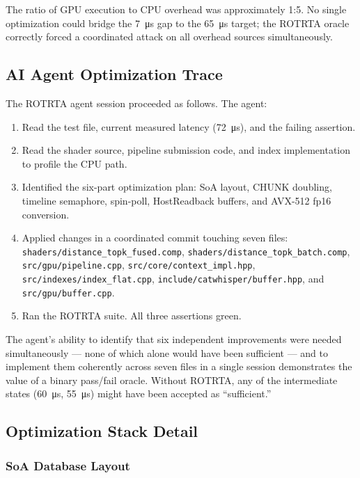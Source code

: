 \documentclass[conference]{IEEEtran}
\begin{document}
The ratio of GPU execution to CPU overhead was approximately 1:5.  No
single optimization could bridge the \SI{7}{\micro\second} gap to the
\SI{65}{\micro\second} target; the ROTRTA oracle correctly forced a
coordinated attack on all overhead sources simultaneously.

\subsection{AI Agent Optimization Trace}

The ROTRTA agent session proceeded as follows.  The agent:

\begin{enumerate}
  \item Read the test file, current measured latency (\SI{72}{\micro\second}),
        and the failing assertion.
  \item Read the shader source, pipeline submission code, and index
        implementation to profile the CPU path.
  \item Identified the six-part optimization plan: SoA layout, CHUNK
        doubling, timeline semaphore, spin-poll, HostReadback buffers, and
        AVX-512 fp16 conversion.
  \item Applied changes in a coordinated commit touching seven files:
        \texttt{shaders/distance\_topk\_fused.comp},
        \texttt{shaders/distance\_topk\_batch.comp},
        \texttt{src/gpu/pipeline.cpp},
        \texttt{src/core/context\_impl.hpp},
        \texttt{src/indexes/index\_flat.cpp},
        \texttt{include/catwhisper/buffer.hpp}, and
        \texttt{src/gpu/buffer.cpp}.
  \item Ran the ROTRTA suite.  All three assertions green.
\end{enumerate}

The agent's ability to identify that six independent improvements were
needed simultaneously --- none of which alone would have been sufficient ---
and to implement them coherently across seven files in a single session
demonstrates the value of a binary pass/fail oracle.  Without ROTRTA, any
of the intermediate states (\SI{60}{\micro\second}, \SI{55}{\micro\second})
might have been accepted as ``sufficient.''

\subsection{Optimization Stack Detail}

\subsubsection{SoA Database Layout}
\end{document}
